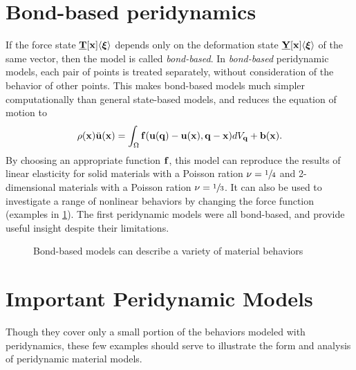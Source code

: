 \section{Bond-based peridynamics}
%
If the force state \(\vstate{T}{\mathbf{x}}{\boldsymbol{\xi}} \) depends only on the deformation state \(\vstate{Y}{\mathbf{x}}{\boldsymbol{\xi}} \) of the same vector, then the model is called \textit{bond-based}.
In \textit{bond-based} peridynamic models, each pair of points is treated separately, without consideration of the behavior of other points. 
This makes bond-based models much simpler computationally than general state-based models, and reduces the equation of motion to
%
\begin{equation}
\label{eq:PDbondEoM}
\rho(\mathbf{x})\ddot{\mathbf{u}}(\mathbf{x}) = \int_\Omega \mathit{\mathbf{f}}(\mathbf{u}(\mathbf{q})-\mathbf{u}(\mathbf{x}),\mathbf{q}-\mathbf{x}) dV_\mathbf{q}  + \mathbf{b}(\mathbf{x}).
\end{equation}
%
By choosing an appropriate function $\mathit{\mathbf{f}}$, this model can reproduce the results of linear elasticity for solid materials with a Poisson ration \(\nu=\sfrac{1}{4}\) and 2-dimensional materials with a Poisson ration \(\nu=\sfrac{1}{3}\). 
It can also be used to investigate a range of nonlinear behaviors by changing the force function (examples in \cref{fig:BondForce}). 
The first peridynamic models were all bond-based, and provide useful insight despite their limitations.
%
\begin{figure}[h]
  \centering
{}
\caption{Bond-based models can describe a variety of material behaviors}
\label{fig:BondForce}
\end{figure}
%

\section{Important Peridynamic Models}
Though they cover only a small portion of the behaviors modeled with peridynamics, these few examples should serve to illustrate the form and analysis of peridynamic material models.
